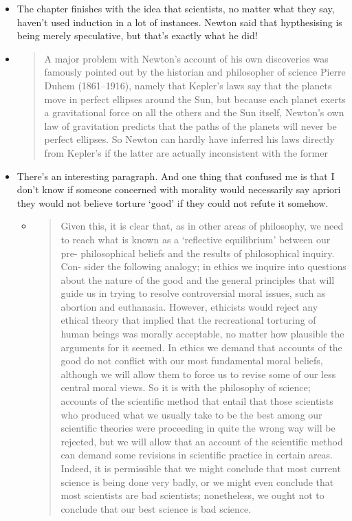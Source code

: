 \documentclass[11pt]{article}
\begin{document}
\begin{itemize}
\item
  The chapter finishes with the idea that scientists, no matter what
  they say, haven't used induction in a lot of instances. Newton said
  that hypthesising is being merely speculative, but that's exactly what
  he did!
\item
  \begin{quote}
  A major problem with Newton's account of his own discoveries was
  famously pointed out by the historian and philosopher of science
  Pierre Duhem (1861--1916), namely that Kepler's laws say that the
  planets move in perfect ellipses around the Sun, but because each
  planet exerts a gravitational force on all the others and the Sun
  itself, Newton's own law of gravitation predicts that the paths of the
  planets will never be perfect ellipses. So Newton can hardly have
  inferred his laws directly from Kepler's if the latter are actually
  inconsistent with the former
  \end{quote}
\item
  There's an interesting paragraph. And one thing that confused me is
  that I don't know if someone concerned with morality would necessarily
  say apriori they would not believe torture `good' if they could not
  refute it somehow.

  \begin{itemize}
  \item
    \begin{quote}
    Given this, it is clear that, as in other areas of philosophy, we
    need to reach what is known as a `reflective equilibrium' between
    our pre- philosophical beliefs and the results of philosophical
    inquiry. Con- sider the following analogy; in ethics we inquire into
    questions about the nature of the good and the general principles
    that will guide us in trying to resolve controversial moral issues,
    such as abortion and euthanasia. However, ethicists would reject any
    ethical theory that implied that the recreational torturing of human
    beings was morally acceptable, no matter how plausible the arguments
    for it seemed. In ethics we demand that accounts of the good do not
    conflict with our most fundamental moral beliefs, although we will
    allow them to force us to revise some of our less central moral
    views. So it is with the philosophy of science; accounts of the
    scientific method that entail that those scientists who produced
    what we usually take to be the best among our scientific theories
    were proceeding in quite the wrong way will be rejected, but we will
    allow that an account of the scientific method can demand some
    revisions in scientific practice in certain areas. Indeed, it is
    permissible that we might conclude that most current science is
    being done very badly, or we might even conclude that most
    scientists are bad scientists; nonetheless, we ought not to conclude
    that our best science is bad science.
    \end{quote}
  \end{itemize}
\end{itemize}
\end{document}
